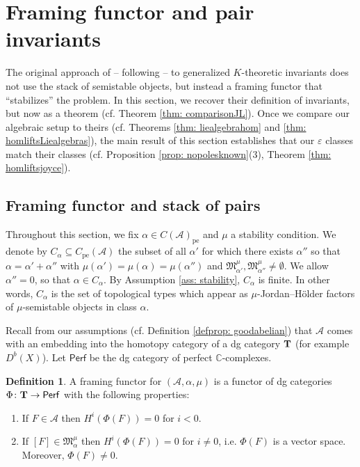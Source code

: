 \documentclass[12pt]{amsart}
\theoremstyle{definition}
\newtheorem{definition}{Definition}[section]
\newcommand{\BC}{{\mathbb{C}}}
\newcommand{\CA}{{\mathcal A}}
\newcommand{\1}{\mathbf 1}
\newcommand{\bfT}{{\bf T}}
\newcommand{\FM}{{\mathfrak{M}}}
\newcommand{\Perf}{\mathsf{Perf}}
\newcommand{\pe}{\mathrm{pe}}
\begin{document}
\section{Framing functor and pair invariants}
\label{sec: framing}

The original approach of \cite{Liu} -- following \cite{joyce} -- to generalized $K$-theoretic invariants does not use the stack of semistable objects, but instead a framing functor that ``stabilizes'' the problem. In this section, we recover their definition of invariants, but now as a theorem (cf. Theorem \ref{thm: comparisonJL}). Once we compare our algebraic setup to theirs (cf. Theorems \ref{thm: liealgebrahom} and \ref{thm: homliftsLiealgebras}), the main result of this section establishes that our $\varepsilon$ classes match their classes (cf. Proposition \ref{prop: nopolesknown}(3), Theorem \ref{thm: homliftsjoyce}).

\subsection{Framing functor and stack of pairs}
\label{subsec: framingdefinitions}

Throughout this section, we fix $\alpha\in C(\CA)_\pe$ and $\mu$ a stability condition. We denote by $C_\alpha\subseteq C_\pe(\CA)$ the subset of all $\alpha'$ for which there exists $\alpha''$ so that $\alpha=\alpha'+\alpha''$ with $\mu(\alpha')=\mu(\alpha)=\mu(\alpha'')$ and $\FM_{\alpha'}^\mu, \FM_{\alpha''}^\mu\neq \emptyset$. We allow $\alpha''=0$, so that $\alpha\in C_\alpha$. By Assumption \ref{ass: stability}, $C_\alpha$ is finite. In other words, $C_\alpha$ is the set of topological types which appear as $\mu$-Jordan--Hölder factors of $\mu$-semistable objects in class $\alpha$. 

Recall from our assumptions (cf. Definition \ref{defprop: goodabelian}) that $\CA$ comes with an embedding into the homotopy category of a dg category $\bfT$ (for example $D^b(X)$). Let $\Perf$ be the dg category of perfect $\BC$-complexes.

\begin{definition}\label{def: framing}
    A framing functor for $(\CA, \alpha, \mu)$ is a functor of dg categories $\Phi\colon \bfT\to \Perf$ with the following properties:
    \begin{enumerate}
        \item If $F\in \CA$ then $H^i(\Phi(F))=0$ for $i<0$.
        \item If $[F]\in \FM_\alpha^\mu$ then $H^i(\Phi(F))=0$ for $i\neq 0$, i.e. $\Phi(F)$ is a vector space. Moreover, $\Phi(F)\neq 0$. 
    \end{enumerate}
\end{definition}
\end{document}
